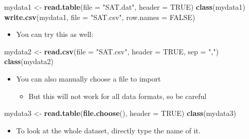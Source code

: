\documentclass[
]{book}
\newenvironment{Shaded}{\begin{snugshade}}{\end{snugshade}}
\newcommand{\AttributeTok}[1]{\textcolor[rgb]{0.13,0.29,0.53}{#1}}
\newcommand{\ConstantTok}[1]{\textcolor[rgb]{0.56,0.35,0.01}{#1}}
\newcommand{\FunctionTok}[1]{\textcolor[rgb]{0.13,0.29,0.53}{\textbf{#1}}}
\newcommand{\NormalTok}[1]{#1}
\newcommand{\OtherTok}[1]{\textcolor[rgb]{0.56,0.35,0.01}{#1}}
\newcommand{\StringTok}[1]{\textcolor[rgb]{0.31,0.60,0.02}{#1}}
\providecommand{\tightlist}{%
  \setlength{\itemsep}{0pt}\setlength{\parskip}{0pt}}
\begin{document}
\begin{Shaded}
\begin{Highlighting}[]
\NormalTok{mydata1 }\OtherTok{\textless{}{-}} \FunctionTok{read.table}\NormalTok{(}\AttributeTok{file =} \StringTok{"SAT.dat"}\NormalTok{, }\AttributeTok{header =} \ConstantTok{TRUE}\NormalTok{)}
\FunctionTok{class}\NormalTok{(mydata1)}
\FunctionTok{write.csv}\NormalTok{(mydata1, }\AttributeTok{file =} \StringTok{"SAT.csv"}\NormalTok{, }\AttributeTok{row.names =} \ConstantTok{FALSE}\NormalTok{)}
\end{Highlighting}
\end{Shaded}

\begin{itemize}
\tightlist
\item
  You can try this as well:
\end{itemize}

\begin{Shaded}
\begin{Highlighting}[]
\NormalTok{mydata2 }\OtherTok{\textless{}{-}} \FunctionTok{read.csv}\NormalTok{(}\AttributeTok{file =} \StringTok{"SAT.csv"}\NormalTok{, }\AttributeTok{header =} \ConstantTok{TRUE}\NormalTok{, }\AttributeTok{sep =} \StringTok{","}\NormalTok{)}
\FunctionTok{class}\NormalTok{(mydata2)}
\end{Highlighting}
\end{Shaded}

\begin{itemize}
\tightlist
\item
  You can also manually choose a file to import

  \begin{itemize}
  \tightlist
  \item
    But this will not work for all data formats, so be careful
  \end{itemize}
\end{itemize}

\begin{Shaded}
\begin{Highlighting}[]
\NormalTok{mydata3 }\OtherTok{\textless{}{-}} \FunctionTok{read.table}\NormalTok{(}\FunctionTok{file.choose}\NormalTok{(), }\AttributeTok{header =} \ConstantTok{TRUE}\NormalTok{)}
\FunctionTok{class}\NormalTok{(mydata3)}
\end{Highlighting}
\end{Shaded}

\begin{itemize}
\tightlist
\item
  To look at the whole dataset, directly type the name of it.
\end{itemize}
\end{document}
